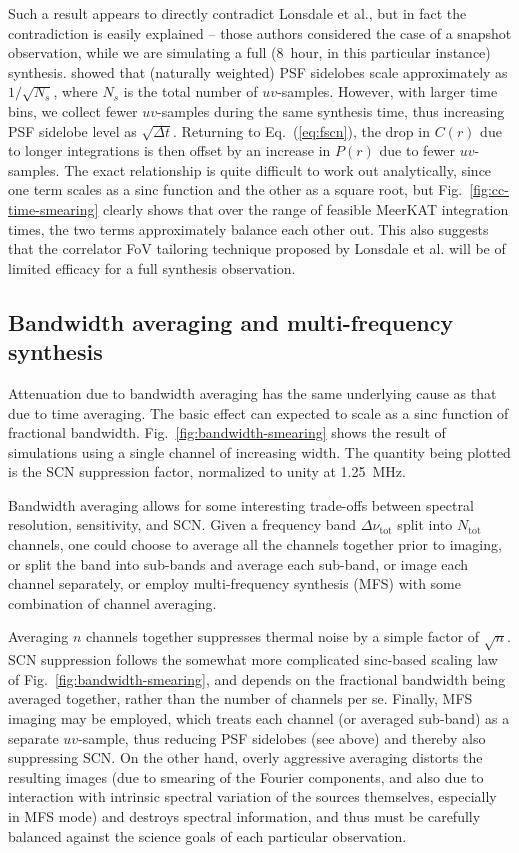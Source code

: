 \documentclass{aa}
\begin{document}
Such a result appears to directly contradict Lonsdale et al., but in fact the contradiction is easily explained -- those authors considered the case of a snapshot observation, while we are simulating a full (8~hour, in this particular instance) synthesis. \citet{SKA49} showed that (naturally weighted) PSF sidelobes scale approximately as $1/\sqrt{N_s}$, where $N_s$ is the total number of $uv$-samples. However, with larger time bins, we collect fewer $uv$-samples during the same synthesis time, thus increasing PSF sidelobe level as $\sqrt{\Delta t}$. Returning to Eq.~(\ref{eq:fscn}), the drop in $C(r)$ due to longer integrations is then offset by an increase in $P(r)$ due to fewer $uv$-samples. The exact relationship is quite difficult to work out analytically, since one term scales as a sinc function and the other as a square root, but  Fig.~\ref{fig:cc-time-smearing} clearly shows that over the range of feasible MeerKAT integration times, the two terms approximately balance each other out. This also 
suggests that the correlator FoV tailoring technique proposed by Lonsdale et al. will be of limited efficacy for a full synthesis observation.

\subsection{Bandwidth averaging and multi-frequency synthesis}
\label{sec:freq-avg}

Attenuation due to bandwidth averaging has the same underlying cause as that due to time averaging. The basic effect can expected to scale as a sinc function of fractional bandwidth. Fig.~\ref{fig:bandwidth-smearing} shows the result of simulations using a single channel of increasing width. The quantity being plotted is the SCN suppression factor, normalized to unity at 1.25~MHz.

Bandwidth averaging allows for some interesting trade-offs between spectral resolution, sensitivity, and SCN. Given a frequency band $\Delta\nu_\mathrm{tot}$ split into $N_\mathrm{tot}$ channels, one could choose to average all the channels together prior to imaging, or split the band into sub-bands and average each sub-band, or image each channel separately, or employ multi-frequency synthesis (MFS) with some combination of channel averaging. 

Averaging $n$ channels together suppresses thermal noise by a simple factor of $\sqrt{n}$. SCN suppression follows the somewhat more complicated sinc-based scaling law of Fig.~\ref{fig:bandwidth-smearing}, and depends on the fractional bandwidth being averaged together, rather than the number of channels per se. Finally, MFS imaging may be employed, which treats each channel (or averaged sub-band) as a separate $uv$-sample, thus reducing PSF sidelobes (see above) and thereby also suppressing SCN. On the other hand, overly aggressive averaging distorts the resulting images (due to smearing of the Fourier components, and also due to interaction with intrinsic spectral variation of the sources themselves, especially in MFS mode) and destroys spectral information, and thus must be carefully balanced against the science goals of each particular observation.
\end{document}
